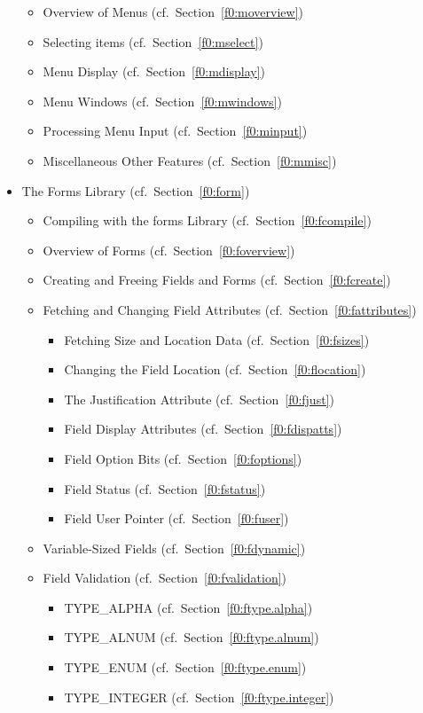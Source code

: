 \begin{itemize}
\begin{itemize}
\item Overview of Menus (cf.\ Section~\ref{f0:moverview})
\item Selecting items (cf.\ Section~\ref{f0:mselect})
\item Menu Display (cf.\ Section~\ref{f0:mdisplay})
\item Menu Windows (cf.\ Section~\ref{f0:mwindows})
\item Processing Menu Input (cf.\ Section~\ref{f0:minput})
\item Miscellaneous Other Features (cf.\ Section~\ref{f0:mmisc})
\end{itemize}
\item The Forms Library (cf.\ Section~\ref{f0:form})
\begin{itemize}
\item Compiling with the forms Library (cf.\ Section~\ref{f0:fcompile})
\item Overview of Forms (cf.\ Section~\ref{f0:foverview})
\item Creating and Freeing Fields and Forms (cf.\ Section~\ref{f0:fcreate})
\item Fetching and Changing Field Attributes (cf.\ Section~\ref{f0:fattributes})
\begin{itemize}
\item Fetching Size and Location Data (cf.\ Section~\ref{f0:fsizes})
\item Changing the Field Location (cf.\ Section~\ref{f0:flocation})
\item The Justification Attribute (cf.\ Section~\ref{f0:fjust})
\item Field Display Attributes (cf.\ Section~\ref{f0:fdispatts})
\item Field Option Bits (cf.\ Section~\ref{f0:foptions})
\item Field Status (cf.\ Section~\ref{f0:fstatus})
\item Field User Pointer (cf.\ Section~\ref{f0:fuser})
\end{itemize}
\item Variable-Sized Fields (cf.\ Section~\ref{f0:fdynamic})
\item Field Validation (cf.\ Section~\ref{f0:fvalidation})
\begin{itemize}
\item TYPE\_ALPHA (cf.\ Section~\ref{f0:ftype.alpha})
\item TYPE\_ALNUM (cf.\ Section~\ref{f0:ftype.alnum})
\item TYPE\_ENUM (cf.\ Section~\ref{f0:ftype.enum})
\item TYPE\_INTEGER (cf.\ Section~\ref{f0:ftype.integer})

\end{itemize}
\end{itemize}
\end{itemize}

